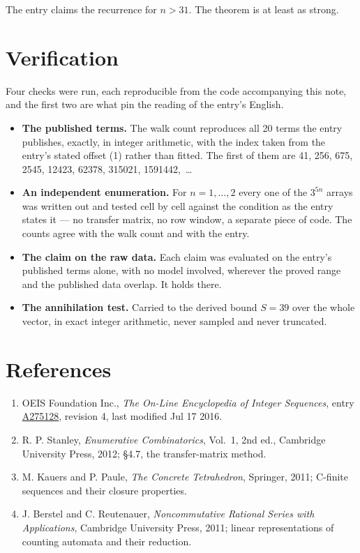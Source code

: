 \documentclass[11pt]{article}
\theoremstyle{definition}
\begin{document}
The entry claims the recurrence for $n > 31$. The theorem is at least as strong.

\section{Verification}

Four checks were run, each reproducible from the code accompanying this note, and the first two are what pin the reading of the entry's English.

\begin{itemize}

\item {\bfseries The published terms.} The walk count reproduces all 20 terms the entry publishes, exactly, in integer arithmetic, with the index taken from the entry's stated offset (1) rather than fitted. The first of them are 41, 256, 675, 2545, 12423, 62378, 315021, 1591442,~\dots

\item {\bfseries An independent enumeration.} For $n = 1,\dots,2$ every one of the $3^{5n}$ arrays was written out and tested cell by cell against the condition as the entry states it --- no transfer matrix, no row window, a separate piece of code. The counts agree with the walk count and with the entry.

\item {\bfseries The claim on the raw data.} Each claim was evaluated on the entry's published terms alone, with no model involved, wherever the proved range and the published data overlap. It holds there.

\item {\bfseries The annihilation test.} Carried to the derived bound $S = 39$ over the whole vector, in exact integer arithmetic, never sampled and never truncated.

\end{itemize}

\section{References}

\begin{enumerate}

\item OEIS Foundation Inc., \emph{The On-Line Encyclopedia of Integer Sequences}, entry \href{https://oeis.org/A275128}{A275128}, revision 4, last modified Jul 17 2016.

\item R. P. Stanley, \emph{Enumerative Combinatorics}, Vol.~1, 2nd ed., Cambridge University Press, 2012; \S4.7, the transfer-matrix method.

\item M. Kauers and P. Paule, \emph{The Concrete Tetrahedron}, Springer, 2011; C-finite sequences and their closure properties.

\item J. Berstel and C. Reutenauer, \emph{Noncommutative Rational Series with Applications}, Cambridge University Press, 2011; linear representations of counting automata and their reduction.

\end{enumerate}
\end{document}
